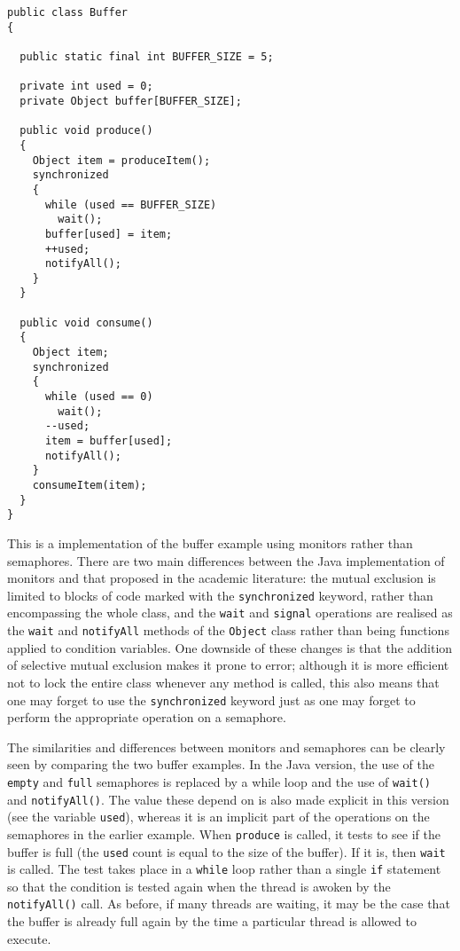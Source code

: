 \begin{verbatim}
public class Buffer
{

  public static final int BUFFER_SIZE = 5;

  private int used = 0;
  private Object buffer[BUFFER_SIZE];
  
  public void produce()
  {
    Object item = produceItem();
    synchronized
    {
      while (used == BUFFER_SIZE)
        wait();
      buffer[used] = item;
      ++used;
      notifyAll();
    }
  }

  public void consume()
  {
    Object item;
    synchronized
    {
      while (used == 0)
        wait();
      --used;
      item = buffer[used];
      notifyAll();
    }
    consumeItem(item);
  }
}
\end{verbatim}

This is a implementation of the buffer example using monitors rather
than semaphores.  There are two main differences between the Java
implementation of monitors and that proposed in the academic
literature: the mutual exclusion is limited to blocks of code marked
with the \texttt{synchronized} keyword, rather than encompassing the
whole class, and the \texttt{wait} and \texttt{signal} operations are
realised as the \texttt{wait} and \texttt{notifyAll} methods of the
\texttt{Object} class rather than being functions applied to condition
variables.  One downside of these changes is that the addition of
selective mutual exclusion makes it prone to error; although it is
more efficient not to lock the entire class whenever any method is
called, this also means that one may forget to use the
\texttt{synchronized} keyword just as one may forget to perform the
appropriate operation on a semaphore.

The similarities and differences between monitors and semaphores can
be clearly seen by comparing the two buffer examples.  In the Java
version, the use of the \texttt{empty} and \texttt{full} semaphores is
replaced by a while loop and the use of \texttt{wait()} and
\texttt{notifyAll()}.  The value these depend on is also made explicit
in this version (see the variable \texttt{used}), whereas it is an
implicit part of the operations on the semaphores in the earlier
example.  When \texttt{produce} is called, it tests to see if the
buffer is full (the \texttt{used} count is equal to the size of the
buffer).  If it is, then \texttt{wait} is called.  The test takes
place in a \texttt{while} loop rather than a single \texttt{if}
statement so that the condition is tested again when the thread is
awoken by the \texttt{notifyAll()} call.  As before, if many threads
are waiting, it may be the case that the buffer is already full again
by the time a particular thread is allowed to execute.

